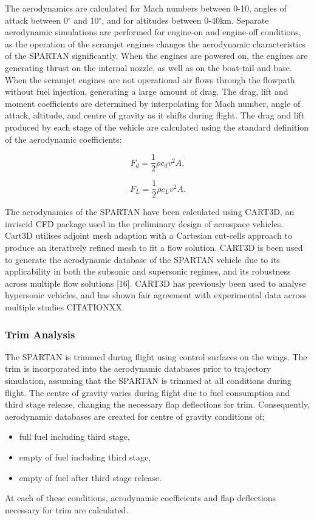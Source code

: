 The aerodynamics are calculated for Mach numbers between 0-10, angles of attack between 0$^\circ$ and 10$^\circ$, and for altitudes between 0-40km. Separate aerodynamic simulations are performed for engine-on and engine-off conditions, as the operation of the scramjet engines changes the aerodynamic characteristics of the SPARTAN significantly. When the engines are powered on, the engines are generating thrust on the internal nozzle, as well as on the boat-tail and base.  When the scramjet engines are not operational air flows through the flowpath without fuel injection, generating a large amount of drag. 
The drag, lift and moment coefficients are determined by interpolating for Mach number, angle of attack, altitude, and centre of gravity as it shifts during flight.
		The drag and lift produced by each stage of the vehicle are calculated using the standard definition of the aerodynamic coefficients:
		
		\begin{equation}
		F_d = \frac{1}{2}\rho c_d v^2 A ,
		\end{equation}
		
		\begin{equation}
		F_L = \frac{1}{2}\rho c_L v^2 A .
		\end{equation}
		
		

				The aerodynamics of the SPARTAN have been calculated using CART3D, an inviscid CFD package used in the preliminary design of aerospace vehicles. Cart3D utilises adjoint mesh adaption with a Cartesian cut-cells approach to produce an iteratively refined mesh to fit a flow solution. CART3D is
				been used to generate the aerodynamic database of the SPARTAN vehicle due to its applicability in both the subsonic
				and supersonic regimes, and its robustness across multiple flow solutions [16]. CART3D has previously been used to
				analyse hypersonic vehicles, and has shown fair agreement with experimental data across multiple studies CITATIONXX.
		
		
		\subsubsection{Trim Analysis}
		
		The SPARTAN is trimmed during flight using control surfaces on the wings. The trim is incorporated into the aerodynamic databases prior to trajectory simulation, assuming that the SPARTAN is trimmed at all conditions during flight. The centre of gravity varies during flight due to fuel consumption and third stage release, changing the necessary flap deflections for trim. Consequently, aerodynamic databases are created for centre of gravity conditions of; 
		\begin{itemize}
			\item full fuel including third stage,
			\item empty of fuel including third stage,
			\item empty of fuel after third stage release.
		\end{itemize}
		At each of these conditions, aerodynamic coefficients and flap deflections necessary for trim are calculated. 
		
